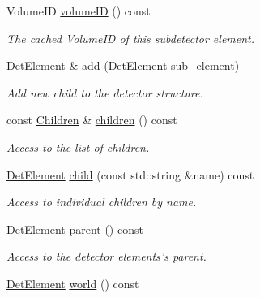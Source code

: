 \begin{DoxyCompactItemize}
VolumeID \hyperlink{class_d_d4hep_1_1_geometry_1_1_det_element_a003e38a1be1b10caa917dd457637d104}{volumeID} () const 
\begin{DoxyCompactList}\small\item\em The cached VolumeID of this subdetector element. \item\end{DoxyCompactList}\item 
\hyperlink{class_d_d4hep_1_1_geometry_1_1_det_element}{DetElement} \& \hyperlink{class_d_d4hep_1_1_geometry_1_1_det_element_a336e54ac88a2f3493f82138699899517}{add} (\hyperlink{class_d_d4hep_1_1_geometry_1_1_det_element}{DetElement} sub\_\-element)
\begin{DoxyCompactList}\small\item\em Add new child to the detector structure. \item\end{DoxyCompactList}\item 
const \hyperlink{class_d_d4hep_1_1_geometry_1_1_det_element_afc41f63ac2a467f5077d1cca1292d580}{Children} \& \hyperlink{class_d_d4hep_1_1_geometry_1_1_det_element_a2c8a811c999fafb4021d5e342fbdee50}{children} () const 
\begin{DoxyCompactList}\small\item\em Access to the list of children. \item\end{DoxyCompactList}\item 
\hyperlink{class_d_d4hep_1_1_geometry_1_1_det_element}{DetElement} \hyperlink{class_d_d4hep_1_1_geometry_1_1_det_element_ab00408422c16bff12f36bbaff9b404a1}{child} (const std::string \&name) const 
\begin{DoxyCompactList}\small\item\em Access to individual children by name. \item\end{DoxyCompactList}\item 
\hyperlink{class_d_d4hep_1_1_geometry_1_1_det_element}{DetElement} \hyperlink{class_d_d4hep_1_1_geometry_1_1_det_element_a6a7a665630b1b3af6dd172d9166b8b8d}{parent} () const 
\begin{DoxyCompactList}\small\item\em Access to the detector elements's parent. \item\end{DoxyCompactList}\item 
\hyperlink{class_d_d4hep_1_1_geometry_1_1_det_element}{DetElement} \hyperlink{class_d_d4hep_1_1_geometry_1_1_det_element_a6ffabad2792a7190089d4a042d5440b8}{world} () const 

\end{DoxyCompactItemize}
